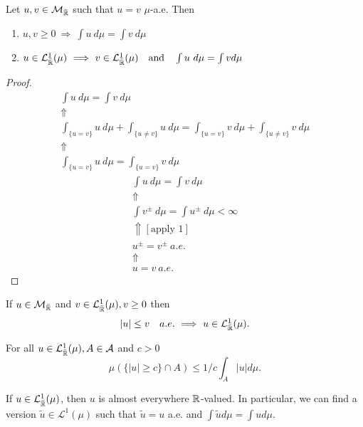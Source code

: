 \begin{thm}
Let \(u,v\in \mathcal{M}_{\bar{\Bbb{R}}}\) such that \(u=v\) \(\mu \)-a.e. Then

\begin{enumerate}
  \item \(u,v\geq 0\  \Longrightarrow \   \int u\  d\mu =\int  v\  d\mu \)
  \item \(u\in \mathcal{L}_{\bar{\Bbb{R}}}^1(\mu )\  \Longrightarrow \  v\in \mathcal{L}_{\bar{\Bbb{R}}}^1(\mu )\quad \text{and}\quad \int u\  d\mu = \int  v d\mu \)
\end{enumerate}
\end{thm}


\begin{proof}
\begin{gather*}
\int u\  d\mu =\int  v\  d\mu  \\
\Uparrow \\
\int _{\{u=v\}} u\  d\mu  + \int _{\{u\neq v\}} u\  d\mu  = \int _{\{u=v\}} v\  d\mu  + \int _{\{u\neq v\}} v\  d\mu  \\
\Uparrow \\
\int _{\{u=v\}} u\  d\mu  = \int _{\{u=v\}} v\  d\mu  
\end{gather*}
\begin{gather*}
\int u\  d\mu = \int  v\  d\mu  \\
\Uparrow  \\
\int v^\pm \  d\mu  = \int u^\pm \  d\mu  < \infty  \\
\Uparrow  [\text{apply 1}] \\
u^\pm  = v^\pm \  a.e. \\
\Uparrow  \\
u=v\  a.e.
\end{gather*}
\end{proof}

\begin{thm}
If \(u\in \mathcal{M}_{\bar{\Bbb{R}}}\) and \(v\in \mathcal{L}_{\bar{\Bbb{R}}}^1(\mu ), v\geq 0\) then
\[
|u|\leq v\quad a.e.\  \Longrightarrow \  u\in \mathcal{L}_{\bar{\Bbb{R}}}^1(\mu ).
\]
\end{thm}

\begin{prop}
For all \(u\in \mathcal{L}_{\bar{\Bbb{R}}}^1(\mu ), A\in \mathcal{A}\) and \(c>0\)
\[
\mu (\{|u|\geq c\} \cap A) \leq  1/c \int _A |u|d\mu .
\]
\end{prop}

\begin{thm}
If \(u\in \mathcal{L}_{\bar{\Bbb{R}}}^1(\mu )\), then \(u\) is almost everywhere \(\Bbb{R}\)-valued. In particular, we can find a version \(\tilde{u}\in \mathcal{L}^1(\mu )\) such that \(\tilde{u}=u\) a.e. and \(\int \tilde{u} d\mu =\int  u d\mu .\)
\end{thm}

